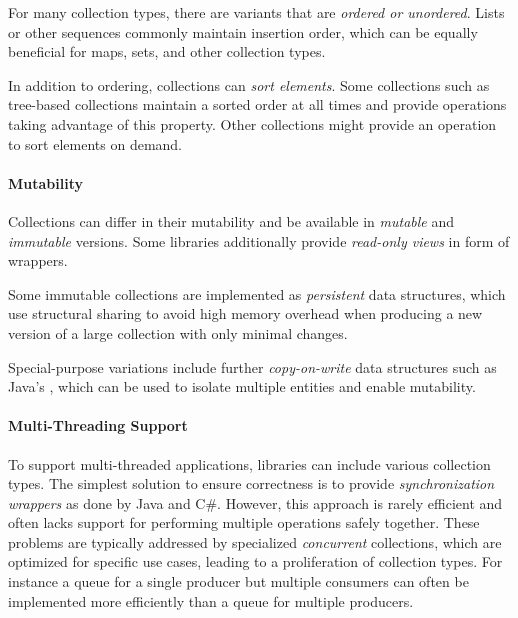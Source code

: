 \documentclass[sigconf, 10pt]{acmart}
\begin{document}
For many collection types,
there are variants that are \emph{ordered or unordered}.
Lists or other sequences commonly maintain insertion order,
which can be equally beneficial for maps, sets, and other collection types.

In addition to ordering, collections can \emph{sort elements}.
Some collections such as tree-based collections maintain a sorted order at all times and
provide operations taking advantage of this property.
Other collections might provide an operation to sort elements on demand.

\paragraph{Mutability}


Collections can differ in their mutability
and be available in \emph{mutable} and \emph{immutable} versions.
Some libraries additionally provide \emph{read-only views} in form of wrappers.

Some immutable collections are implemented as \emph{persistent} data structures,
which use structural sharing to avoid high memory overhead when producing
a new version of a large collection with only minimal changes.

Special-purpose variations include further
\emph{copy-on-write} data structures
such as Java's ,
which can be used to isolate multiple entities
and enable mutability.


\paragraph{Multi-Threading Support}


To support multi-threaded applications, 
libraries can include various collection types.
The simplest solution to ensure correctness is
to provide \emph{synchronization wrappers} as done by Java and C\#.
However, this approach is rarely efficient
and often lacks support for performing multiple operations safely together.
These problems are typically addressed
by specialized \emph{concurrent} collections,
which are optimized for specific use cases,
leading to a proliferation of collection types.
For instance a queue for a single producer but multiple consumers
can often be implemented
more efficiently than a queue for multiple producers.
\end{document}
